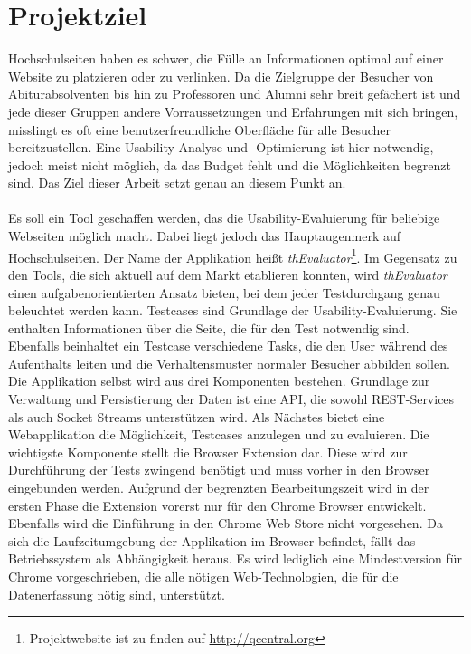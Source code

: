 %
%
%
%

\section{Projektziel}

Hochschulseiten haben es schwer, die Fülle an Informationen optimal auf einer Website zu platzieren oder zu verlinken. Da die Zielgruppe der Besucher von Abiturabsolventen bis hin zu Professoren und Alumni sehr breit gefächert ist und jede dieser Gruppen andere Vorraussetzungen und Erfahrungen mit sich bringen, misslingt es oft eine benutzerfreundliche Oberfläche für alle Besucher bereitzustellen. Eine Usability-Analyse und -Optimierung ist hier notwendig, jedoch meist nicht möglich, da das Budget fehlt und die Möglichkeiten begrenzt sind. Das Ziel dieser Arbeit setzt genau an diesem Punkt an.\\
\\
Es soll ein Tool geschaffen werden, das die Usability-Evaluierung für beliebige Webseiten möglich macht. Dabei liegt jedoch das Hauptaugenmerk auf Hochschulseiten. Der Name der Applikation heißt \textit{thEvaluator}\footnote{Projektwebsite ist zu finden auf \url{http://qcentral.org}}. Im Gegensatz zu den Tools, die sich aktuell auf dem Markt etablieren konnten, wird \textit{thEvaluator} einen aufgabenorientierten Ansatz bieten, bei dem jeder Testdurchgang genau beleuchtet werden kann. Testcases sind Grundlage der Usability-Evaluierung. Sie enthalten Informationen über die Seite, die für den Test notwendig sind. Ebenfalls beinhaltet ein Testcase verschiedene  Tasks, die den User während des Aufenthalts leiten und die Verhaltensmuster normaler Besucher abbilden sollen. Die Applikation selbst wird aus drei Komponenten bestehen. Grundlage zur Verwaltung und Persistierung der Daten ist eine API, die sowohl REST-Services als auch Socket Streams unterstützen wird. Als Nächstes bietet eine Webapplikation die Möglichkeit, Testcases anzulegen und zu evaluieren. Die wichtigste Komponente stellt die Browser Extension dar. Diese wird zur Durchführung der Tests zwingend benötigt und muss vorher in den Browser eingebunden werden. Aufgrund der begrenzten Bearbeitungszeit wird in der ersten Phase die Extension vorerst nur für den Chrome Browser entwickelt. Ebenfalls wird die Einführung in den Chrome Web Store nicht vorgesehen. Da sich die Laufzeitumgebung der Applikation im Browser befindet, fällt das Betriebssystem als Abhängigkeit heraus. Es wird lediglich eine Mindestversion für Chrome vorgeschrieben, die alle nötigen Web-Technologien, die für die Datenerfassung nötig sind, unterstützt.\\
